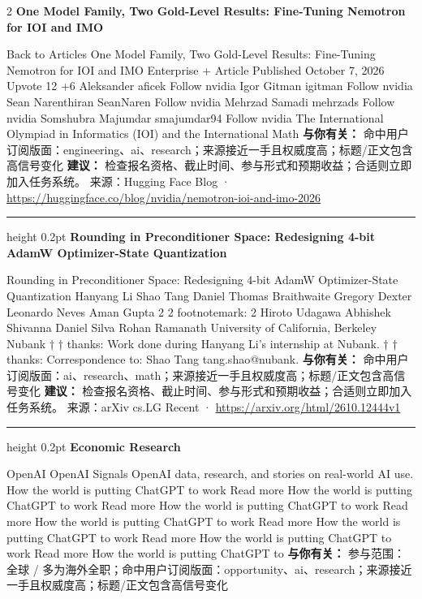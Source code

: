 \documentclass[10.5pt]{ctexart}
\begin{document}
\begin{multicols}{2}
{\large\bfseries One Model Family, Two Gold-Level Results: Fine-Tuning Nemotron for IOI and IMO}\par
Back to Articles One Model Family, Two Gold-Level Results: Fine-Tuning Nemotron for IOI and IMO Enterprise + Article Published October 7, 2026 Upvote 12 +6 Aleksander aficek Follow nvidia Igor Gitman igitman Follow nvidia Sean Narenthiran SeanNaren Follow nvidia Mehrzad Samadi mehrzads Follow nvidia Somshubra Majumdar smajumdar94 Follow nvidia The International Olympiad in Informatics (IOI) and the International Math
\textbf{与你有关：} 命中用户订阅版面：engineering、ai、research；来源接近一手且权威度高；标题/正文包含高信号变化
\textbf{建议：} 检查报名资格、截止时间、参与形式和预期收益；合适则立即加入任务系统。
{\footnotesize\color{ormuted} 来源：Hugging Face Blog · \url{https://huggingface.co/blog/nvidia/nemotron-ioi-and-imo-2026}}
\vspace{2mm}
\hrule height 0.2pt
\vspace{2mm}
{\large\bfseries Rounding in Preconditioner Space: Redesigning 4-bit AdamW Optimizer-State Quantization}\par
Rounding in Preconditioner Space: Redesigning 4-bit AdamW Optimizer-State Quantization Hanyang Li Shao Tang Daniel Thomas Braithwaite Gregory Dexter Leonardo Neves Aman Gupta 2 2 footnotemark: 2 Hiroto Udagawa Abhishek Shivanna Daniel Silva Rohan Ramanath University of California, Berkeley Nubank † † thanks: Work done during Hanyang Li’s internship at Nubank. † † thanks: Correspondence to: Shao Tang tang.shao@nubank.
\textbf{与你有关：} 命中用户订阅版面：ai、research、math；来源接近一手且权威度高；标题/正文包含高信号变化
\textbf{建议：} 检查报名资格、截止时间、参与形式和预期收益；合适则立即加入任务系统。
{\footnotesize\color{ormuted} 来源：arXiv cs.LG Recent · \url{https://arxiv.org/html/2610.12444v1}}
\vspace{2mm}
\hrule height 0.2pt
\vspace{2mm}
{\large\bfseries Economic Research}\par
OpenAI OpenAI Signals OpenAI data, research, and stories on real-world AI use. How the world is putting ChatGPT to work Read more How the world is putting ChatGPT to work Read more How the world is putting ChatGPT to work Read more How the world is putting ChatGPT to work Read more How the world is putting ChatGPT to work Read more How the world is putting ChatGPT to work Read more How the world is putting ChatGPT to
\textbf{与你有关：} 参与范围：全球 / 多为海外全职；命中用户订阅版面：opportunity、ai、research；来源接近一手且权威度高；标题/正文包含高信号变化

\end{multicols}
\end{document}
